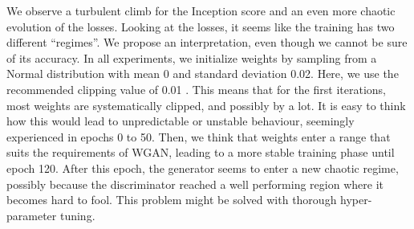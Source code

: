 We observe a turbulent climb for the Inception score and an even more chaotic evolution of the losses. Looking at the losses, it seems like the training has two different ``regimes''. We propose an interpretation, even though we cannot be sure of its accuracy. In all experiments, we initialize weights by sampling from a Normal distribution with mean 0 and standard deviation 0.02. Here, we use the recommended clipping value of 0.01 \cite{arjovsky2017wasserstein}. This means that for the first iterations, most weights are systematically clipped, and possibly by a lot. It is easy to think how this would lead to unpredictable or unstable behaviour, seemingly experienced in epochs 0 to 50. Then, we think that weights enter a range that suits the requirements of WGAN, leading to a more stable training phase until epoch 120. After this epoch, the generator seems to enter a new chaotic regime, possibly because the discriminator reached a well performing region where it becomes hard to fool. This problem might be solved with thorough hyper-parameter tuning.